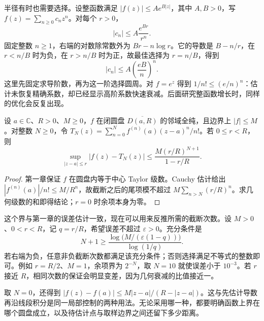 \ProseParagraphBreak

半径有时也需要选择。设整函数满足 \(|f(z)|\le A e^{B|z|}\)，其中 \(A,B>0\)，写 \(f(z)=\sum_{n\ge0}c_nz^n\)。对每个 \(r>0\)，
\[
 |c_n|\le A\frac{e^{Br}}{r^n}.
\]
固定整数 \(n\ge1\)，右端的对数除常数外为 \(Br-n\log r\)。它的导数是 \(B-n/r\)，在 \(r<n/B\) 时为负，在 \(r>n/B\) 时为正，故最佳选择为 \(r=n/B\)，得到
\[
 |c_n|\le A\left(\frac{eB}{n}\right)^n.
\]
这里先固定求导阶数，再为这一阶选择圆周。对 \(f=e^z\) 得到 \(1/n!\le(e/n)^n\)：估计未恢复精确系数，却已经显示高阶系数快速衰减。后面研究整函数增长时，同样的优化会反复出现。

\begin{proposition}\label{b3:prop:02-taylor-remainder}
设 \(a\in\mathbb C\)、\(R>0\)、\(M\ge0\)，\(f\) 在闭圆盘 \(\overline{D(a,R)}\) 的邻域全纯，且边界上 \(|f|\le M\)。对整数 \(N\ge0\)，令 \(T_N(z)=\sum_{n=0}^N f^{(n)}(a)(z-a)^n/n!\)。若 \(0\le r<R\)，则
\[
 \sup_{|z-a|\le r}|f(z)-T_N(z)|
 \le \frac{M(r/R)^{N+1}}{1-r/R}.
\]
\end{proposition}
\begin{proof}
第一章保证 \(f\) 在圆盘内等于中心 Taylor 级数。Cauchy 估计给出 \(|f^{(n)}(a)|/n!\le M/R^n\)，故截断之后的尾项模不超过 \(M\sum_{n>N}(r/R)^n\)。求几何级数的和即得结论；\(r=0\) 时余项本身为零。
\end{proof}

这个界与第一章的误差估计一致，现在可以用来反推所需的截断次数。设 \(M>0\)、\(0<r<R\)，记 \(q=r/R\)，希望误差不超过 \(\varepsilon>0\)。充分条件是
\[
 N+1\ge
 \frac{\log\bigl(M/(\varepsilon(1-q))\bigr)}{\log(1/q)}.
\]
若右端为负，任意非负截断次数都满足该充分条件；否则选择满足不等式的整数即可。例如 \(r=R/2\)、\(M=1\)，余项界为 \(2^{-N}\)，取 \(N=10\) 就使误差小于 \(10^{-3}\)。若 \(r\) 接近 \(R\)，相同次数的保证会明显变差，因为几何衰减的比值接近一。

\ProseParagraphBreak

取 \(N=0\)，还得到 \(|f(z)-f(a)|\le M|z-a|/(R-|z-a|)\)。这与先估计导数再沿线段积分是同一局部控制的两种用法。无论采用哪一种，都要明确函数上界在哪个圆盘成立，以及待估计点与取样边界之间还留下多少距离。
